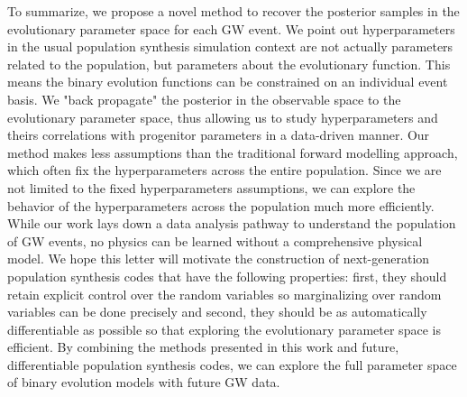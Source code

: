 \documentclass[twocolumn]{aastex631}
\begin{document}
To summarize, we propose a novel method to recover the posterior samples in the evolutionary parameter space for each GW event.
We point out hyperparameters in the usual population synthesis simulation context are not actually parameters related to the population,
but parameters about the evolutionary function.
This means the binary evolution functions can be constrained on an individual event basis.
We "back propagate" the posterior in the observable space to the evolutionary parameter space,
thus allowing us to study hyperparameters and theirs correlations with progenitor parameters in a data-driven manner.
Our method makes less assumptions than the traditional forward modelling approach,
which often fix the hyperparameters across the entire population.
Since we are not limited to the fixed hyperparameters assumptions, we can explore the behavior of the hyperparameters across the population much more efficiently.
While our work lays down a data analysis pathway to understand the population of GW events,
no physics can be learned without a comprehensive physical model.
We hope this letter will motivate the construction of next-generation population synthesis codes that have the following properties:
first, they should retain explicit control over the random variables so marginalizing over random variables can be done precisely and
second, they should be as automatically differentiable as possible so that exploring the evolutionary parameter space is efficient.
By combining the methods presented in this work and future, differentiable population synthesis codes,
we can explore the full parameter space of binary evolution models with future GW data.
\end{document}
